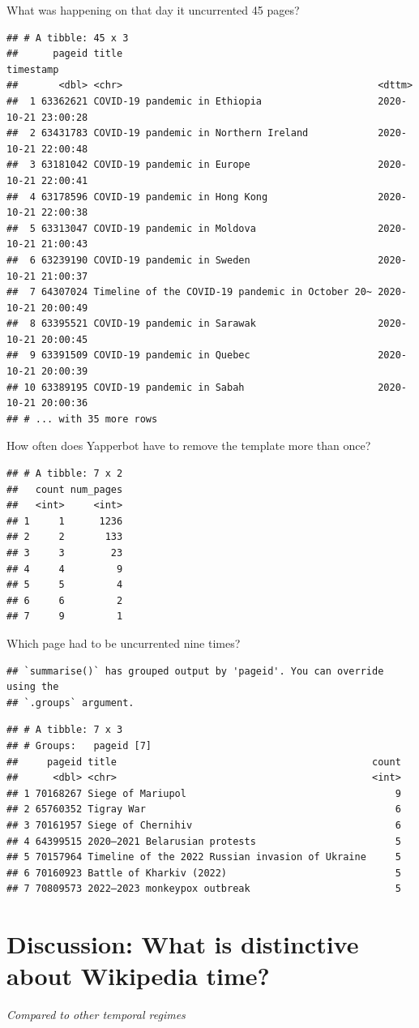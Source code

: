 \documentclass[Royal,times,sageh]{sagej}
\begin{document}
What was happening on that day it uncurrented 45 pages?

\begin{verbatim}
## # A tibble: 45 x 3
##      pageid title                                            timestamp          
##       <dbl> <chr>                                            <dttm>             
##  1 63362621 COVID-19 pandemic in Ethiopia                    2020-10-21 23:00:28
##  2 63431783 COVID-19 pandemic in Northern Ireland            2020-10-21 22:00:48
##  3 63181042 COVID-19 pandemic in Europe                      2020-10-21 22:00:41
##  4 63178596 COVID-19 pandemic in Hong Kong                   2020-10-21 22:00:38
##  5 63313047 COVID-19 pandemic in Moldova                     2020-10-21 21:00:43
##  6 63239190 COVID-19 pandemic in Sweden                      2020-10-21 21:00:37
##  7 64307024 Timeline of the COVID-19 pandemic in October 20~ 2020-10-21 20:00:49
##  8 63395521 COVID-19 pandemic in Sarawak                     2020-10-21 20:00:45
##  9 63391509 COVID-19 pandemic in Quebec                      2020-10-21 20:00:39
## 10 63389195 COVID-19 pandemic in Sabah                       2020-10-21 20:00:36
## # ... with 35 more rows
\end{verbatim}

How often does Yapperbot have to remove the template more than once?

\begin{verbatim}
## # A tibble: 7 x 2
##   count num_pages
##   <int>     <int>
## 1     1      1236
## 2     2       133
## 3     3        23
## 4     4         9
## 5     5         4
## 6     6         2
## 7     9         1
\end{verbatim}

Which page had to be uncurrented nine times?

\begin{verbatim}
## `summarise()` has grouped output by 'pageid'. You can override using the
## `.groups` argument.
\end{verbatim}

\begin{verbatim}
## # A tibble: 7 x 3
## # Groups:   pageid [7]
##     pageid title                                            count
##      <dbl> <chr>                                            <int>
## 1 70168267 Siege of Mariupol                                    9
## 2 65760352 Tigray War                                           6
## 3 70161957 Siege of Chernihiv                                   6
## 4 64399515 2020–2021 Belarusian protests                        5
## 5 70157964 Timeline of the 2022 Russian invasion of Ukraine     5
## 6 70160923 Battle of Kharkiv (2022)                             5
## 7 70809573 2022–2023 monkeypox outbreak                         5
\end{verbatim}

\hypertarget{discussion-what-is-distinctive-about-wikipedia-time}{%
\section{Discussion: What is distinctive about Wikipedia
time?}\label{discussion-what-is-distinctive-about-wikipedia-time}}

\emph{Compared to other temporal regimes}



\end{document}
